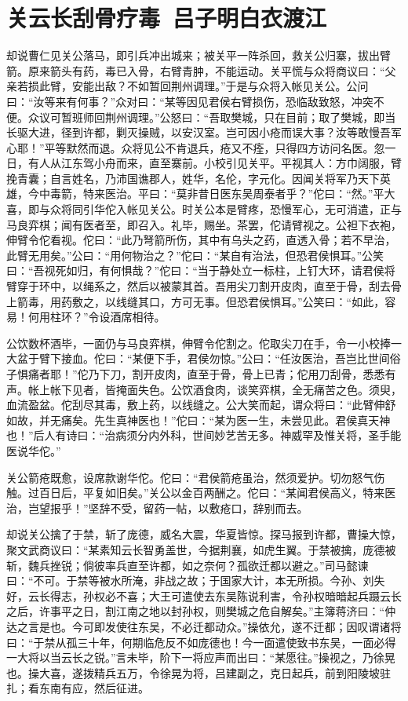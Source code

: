 \chapter{关云长刮骨疗毒~吕子明白衣渡江}

却说曹仁见关公落马，即引兵冲出城来；被关平一阵杀回，救关公归寨，拔出臂箭。原来箭头有药，毒已入骨，右臂青肿，不能运动。关平慌与众将商议曰：“父亲若损此臂，安能出敌？不如暂回荆州调理。”于是与众将入帐见关公。公问曰：“汝等来有何事？”众对曰：“某等因见君侯右臂损伤，恐临敌致怒，冲突不便。众议可暂班师回荆州调理。”公怒曰：“吾取樊城，只在目前；取了樊城，即当长驱大进，径到许都，剿灭操贼，以安汉室。岂可因小疮而误大事？汝等敢慢吾军心耶！”平等默然而退。众将见公不肯退兵，疮又不痊，只得四方访问名医。忽一日，有人从江东驾小舟而来，直至寨前。小校引见关平。平视其人：方巾阔服，臂挽青囊；自言姓名，乃沛国谯郡人，姓华，名伦，字元化。因闻关将军乃天下英雄，今中毒箭，特来医治。平曰：“莫非昔日医东吴周泰者乎？”佗曰：“然。”平大喜，即与众将同引华佗入帐见关公。时关公本是臂疼，恐慢军心，无可消遣，正与马良弈棋；闻有医者至，即召入。礼毕，赐坐。茶罢，佗请臂视之。公袒下衣袍，伸臂令佗看视。佗曰：“此乃弩箭所伤，其中有乌头之药，直透入骨；若不早治，此臂无用矣。”公曰：“用何物治之？”佗曰：“某自有治法，但恐君侯惧耳。”公笑曰：“吾视死如归，有何惧哉？”佗曰：“当于静处立一标柱，上钉大环，请君侯将臂穿于环中，以绳系之，然后以被蒙其首。吾用尖刀割开皮肉，直至于骨，刮去骨上箭毒，用药敷之，以线缝其口，方可无事。但恐君侯惧耳。”公笑曰：“如此，容易！何用柱环？”令设酒席相待。

公饮数杯酒毕，一面仍与马良弈棋，伸臂令佗割之。佗取尖刀在手，令一小校捧一大盆于臂下接血。佗曰：“某便下手，君侯勿惊。”公曰：“任汝医治，吾岂比世间俗子惧痛者耶！”佗乃下刀，割开皮肉，直至于骨，骨上已青；佗用刀刮骨，悉悉有声。帐上帐下见者，皆掩面失色。公饮酒食肉，谈笑弈棋，全无痛苦之色。须臾，血流盈盆。佗刮尽其毒，敷上药，以线缝之。公大笑而起，谓众将曰：“此臂伸舒如故，并无痛矣。先生真神医也！”佗曰：“某为医一生，未尝见此。君侯真天神也！”后人有诗曰：“治病须分内外科，世间妙艺苦无多。神威罕及惟关将，圣手能医说华佗。”

关公箭疮既愈，设席款谢华佗。佗曰：“君侯箭疮虽治，然须爱护。切勿怒气伤触。过百日后，平复如旧矣。”关公以金百两酬之。佗曰：“某闻君侯高义，特来医治，岂望报乎！”坚辞不受，留药一帖，以敷疮口，辞别而去。

却说关公擒了于禁，斩了庞德，威名大震，华夏皆惊。探马报到许都，曹操大惊，聚文武商议曰：“某素知云长智勇盖世，今据荆襄，如虎生翼。于禁被擒，庞德被斩，魏兵挫锐；倘彼率兵直至许都，如之奈何？孤欲迁都以避之。”司马懿谏曰：“不可。于禁等被水所淹，非战之故；于国家大计，本无所损。今孙、刘失好，云长得志，孙权必不喜；大王可遣使去东吴陈说利害，令孙权暗暗起兵蹑云长之后，许事平之日，割江南之地以封孙权，则樊城之危自解矣。”主簿蒋济曰：“仲达之言是也。今可即发使往东吴，不必迁都动众。”操依允，遂不迁都；因叹谓诸将曰：“于禁从孤三十年，何期临危反不如庞德也！今一面遣使致书东吴，一面必得一大将以当云长之锐。”言未毕，阶下一将应声而出曰：“某愿往。”操视之，乃徐晃也。操大喜，遂拨精兵五万，令徐晃为将，吕建副之，克日起兵，前到阳陵坡驻扎；看东南有应，然后征进。

